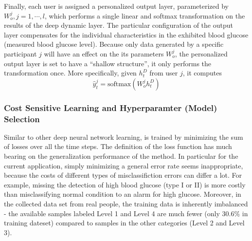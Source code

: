 Finally, each user is assigned a personalized output layer, parameterized by $W_o^j, j=1,\cdots,l$, which performs a single linear and softmax transformation on the results of the deep dynamic layer.
The particular configuration of the output layer compensates for the individual characteristics in the exhibited blood glucose (\ie measured blood glucose level).
Because only data generated by a specific participant $j$ will have an effect on the its parameters $W_o^j$, the personalized output layer is set to have a ``shallow structure'', \ie it only performs the transformation once.
More specifically, given $h^D_t$ from user $j$, it computes
\begin{equation}
\hat{y}_t^j = \text{softmax} \left( W_o^j h^D_t \right)
\end{equation}

\subsubsection{Cost Sensitive Learning and Hyperparamter (Model) Selection}
Similar to other deep neural network learning, \modelname is trained by minimizing the sum of losses over all the time steps.
The definition of the loss function has much bearing on the generalization performance of the method.
In particular for the current application, simply minimizing a general error rate seems inappropriate, because the costs of different types of misclassifiction errors can differ a lot.
For example, missing the detection of high blood glucose (type I or II) is more costly than misclassifying normal condition to an alarm for high glucose.
Moreover, in the collected data set from real people, the training data is inherently imbalanced - the available samples labeled Level 1 and Level 4 are much fewer (only 30.6\% in training dateset) compared to samples in the other categories (Level 2 and Level 3).

